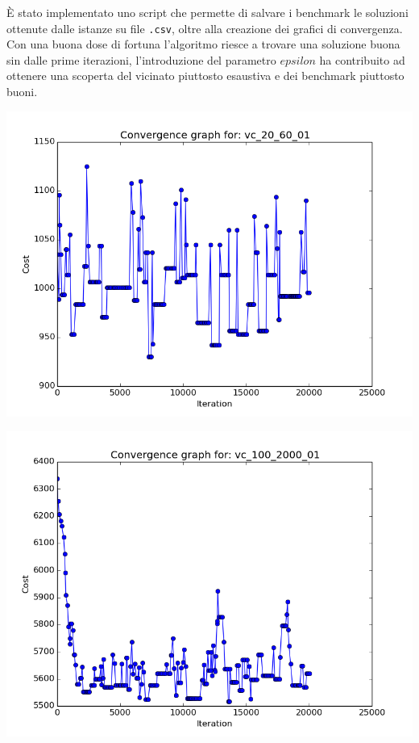 \documentclass[11pt]{article}
\begin{document}
È stato implementato uno script che permette di salvare i benchmark le soluzioni ottenute dalle istanze su  file \verb|.csv|, oltre alla creazione dei grafici di convergenza.
Con una buona dose di fortuna l'algoritmo riesce a trovare una soluzione buona sin dalle prime iterazioni, l'introduzione del parametro \texttt{$epsilon$} ha contribuito ad ottenere una scoperta del vicinato piuttosto esaustiva e dei benchmark piuttosto buoni.

\begin{center}
\begin{minipage}{0.48\linewidth}
\includegraphics[width=\linewidth]{cg_1.png}
\end{minipage}%
\begin{minipage}{0.49\linewidth}
\includegraphics[width=\linewidth]{cg_2.png}

\end{minipage}
\end{center}
\end{document}
